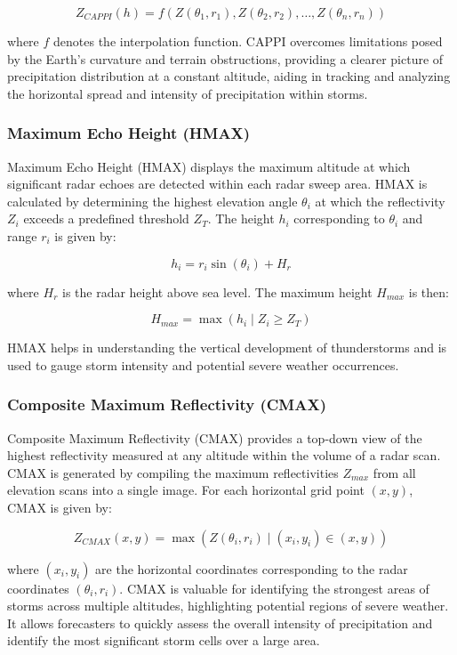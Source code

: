 \[
Z_{CAPPI}(h) = f(Z(\theta_1, r_1), Z(\theta_2, r_2), \ldots, Z(\theta_n, r_n))
\]

where $f$ denotes the interpolation function. CAPPI overcomes limitations posed
by the Earth's curvature and terrain obstructions, providing a clearer picture
of precipitation distribution at a constant altitude, aiding in tracking and
analyzing the horizontal spread and intensity of precipitation within storms.

\subsubsection*{Maximum Echo Height (HMAX)}

Maximum Echo Height (HMAX) displays the maximum altitude at which significant
radar echoes are detected within each radar sweep area. HMAX is calculated by
determining the highest elevation angle $\theta_i$ at which the reflectivity
$Z_i$ exceeds a predefined threshold $Z_T$. The height $h_i$ corresponding to
$\theta_i$ and range $r_i$ is given by:

\[
h_i = r_i \sin(\theta_i) + H_r
\]

where $H_r$ is the radar height above sea level. The maximum height $H_{max}$ is
then:

\[
H_{max} = \max(h_i \mid Z_i \geq Z_T)
\]

HMAX helps in understanding the vertical development of thunderstorms and is
used to gauge storm intensity and potential severe weather occurrences.

\subsubsection*{Composite Maximum Reflectivity (CMAX)}

Composite Maximum Reflectivity (CMAX) provides a top-down view of the highest
reflectivity measured at any altitude within the volume of a radar scan. CMAX is
generated by compiling the maximum reflectivities $Z_{max}$ from all elevation
scans into a single image. For each horizontal grid point $(x, y)$, CMAX is
given by:

\[
Z_{CMAX}(x, y) = \max(Z(\theta_i, r_i) \mid (x_i, y_i) \in (x, y))
\]

where $(x_i, y_i)$ are the horizontal coordinates corresponding to the radar
coordinates $(\theta_i, r_i)$. CMAX is valuable for identifying the strongest
areas of storms across multiple altitudes, highlighting potential regions of
severe weather. It allows forecasters to quickly assess the overall intensity of
precipitation and identify the most significant storm cells over a large area.


